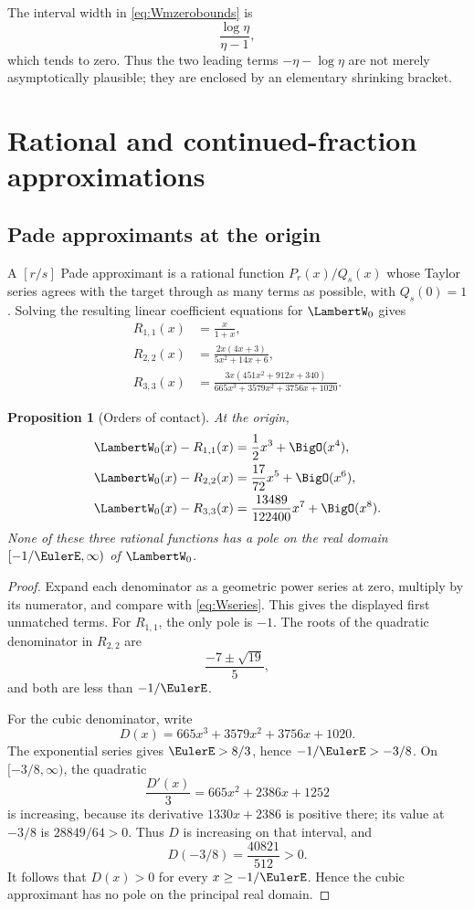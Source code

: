 \documentclass[11pt]{article}
\newtheorem{proposition}[proposition]{Proposition}
\theoremstyle{remark}
\newcommand{\Wz}{\LambertW_{0}}
\begin{document}
The interval width in \eqref{eq:Wmzerobounds} is
\[
       \frac{\log\eta}{\eta-1},
\]
which tends to zero.  Thus the two leading terms
\(-\eta-\log\eta\) are not merely asymptotically plausible; they are enclosed
by an elementary shrinking bracket.

\section{Rational and continued-fraction approximations}\label{sec:rational}

\subsection{Pade approximants at the origin}

A \([r/s]\) Pade approximant is a rational function \(P_r(x)/Q_s(x)\)
whose Taylor series agrees with the target through as many terms as possible,
with \(Q_s(0)=1\).  Solving the resulting linear coefficient equations for
\(\Wz\) gives
\begin{align}
 R_{1,1}(x)&=\frac{x}{1+x},\label{eq:pade11}\\
 R_{2,2}(x)&=\frac{2x(4x+3)}{5x^2+14x+6},\label{eq:pade22}\\
 R_{3,3}(x)&=
 \frac{3x(451x^2+912x+340)}
 {665x^3+3579x^2+3756x+1020}.\label{eq:pade33}
\end{align}

\begin{proposition}[Orders of contact]\label{prop:pade-errors}
At the origin,
\begin{align}
 \Wz(x)-R_{1,1}(x)&=\frac12x^3+\BigO(x^4),\\
 \Wz(x)-R_{2,2}(x)&=\frac{17}{72}x^5+\BigO(x^6),\\
 \Wz(x)-R_{3,3}(x)&=\frac{13489}{122400}x^7+\BigO(x^8).
\end{align}
None of these three rational functions has a pole on the real domain
\([-1/\EulerE,\infty)\) of \(\Wz\).
\end{proposition}

\begin{proof}
Expand each denominator as a geometric power series at zero, multiply by its
numerator, and compare with \eqref{eq:Wseries}.  This gives the displayed
first unmatched terms.  For \(R_{1,1}\), the only pole is \(-1\).  The roots
of the quadratic denominator in \(R_{2,2}\) are
\[
       \frac{-7\pm\sqrt{19}}5,
\]
and both are less than \(-1/\EulerE\).

For the cubic denominator, write
\[
       D(x)=665x^3+3579x^2+3756x+1020.
\]
The exponential series gives \(\EulerE>8/3\), hence
\(-1/\EulerE>-3/8\).  On \([-3/8,\infty)\), the quadratic
\[
       \frac{D'(x)}3=665x^2+2386x+1252
\]
is increasing, because its derivative \(1330x+2386\) is positive there;
its value at \(-3/8\) is \(28849/64>0\).  Thus \(D\) is increasing on
that interval, and
\[
       D(-3/8)=\frac{40821}{512}>0.
\]
It follows that \(D(x)>0\) for every \(x\geq-1/\EulerE\).  Hence the cubic
approximant has no pole on the principal real domain.
\end{proof}
\end{document}
